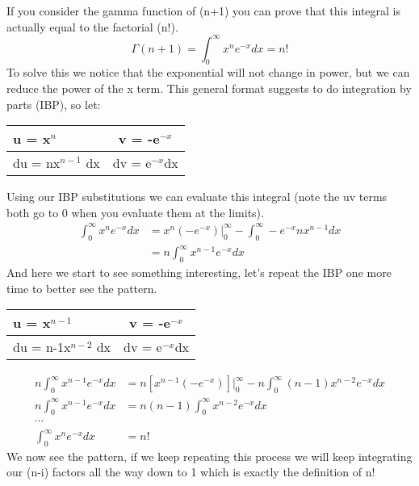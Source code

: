 \documentclass{article}
\begin{document}
If you consider the gamma function of (n+1) you can prove that this integral is actually equal to the factorial (n!). 
\begin{equation}
    \Gamma(n+1) = \int_0^\infty x^{n}e^{-x}dx = n!
\end{equation}
To solve this we notice that the exponential will not change in power, but we can reduce the power of the x term. 
This general format suggests to do integration by parts (IBP), so let: 
\begin{center}
  \begin{tabular}{ | l | c | }
    \hline
    u = x$^n$ & v = -e$^{-x}$ \\ \hline
    du = nx$^{n-1}$ dx & dv = e$^{-x}$dx  \\
    \hline
  \end{tabular}
\end{center}
Using our IBP substitutions we can evaluate this integral (note the uv terms both go to 0 when you evaluate them at the limits).
\begin{equation}
\begin{split}
    \int_0^\infty x^{n}e^{-x}dx &= x^n(-e^{-x}) \Big|_0^\infty - \int_0^\infty -e^{-x}nx^{n-1}dx \\
    &= n\int_0^\infty x^{n-1}e^{-x}dx
    \end{split}
\end{equation}
And here we start to see something interesting, let's repeat the IBP one more time to better see the pattern.
\begin{center}
  \begin{tabular}{ | l | c | }
    \hline
    u = x$^{n-1}$ & v = -e$^{-x}$ \\ \hline
    du = n-1x$^{n-2}$ dx & dv = e$^{-x}$dx  \\
    \hline
  \end{tabular}
\end{center}
\begin{equation}
\begin{split}
n\int_0^\infty x^{n-1}e^{-x}dx &= n\left[ x^{n-1}(-e^{-x})\right]\Big|_0^\infty - n\int_0^\infty (n-1)x^{n-2}e^{-x}dx \\
n\int_0^\infty x^{n-1}e^{-x}dx &= n(n-1)\int_0^\infty x^{n-2}e^{-x}dx \\
\cdots \\
\int_0^\infty x^{n}e^{-x}dx &= n!
\end{split}
\end{equation}
We now see the pattern, if we keep repeating this process we will keep integrating our (n-i) factors all the way down to 1 which is exactly the definition of n!
\end{document}
